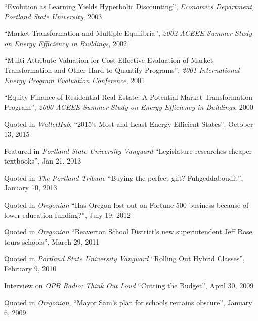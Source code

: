 \documentclass[Computer Science]{vita}
\begin{document}
\begin{vita}
\begin{Presentations and Invited Talks}
  \item ``Evolution as Learning Yields Hyperbolic Discounting'',
    \emph{Economics Department, Portland State University}, 2003

  \item ``Market Transformation and Multiple Equilibria'', \emph{2002
      ACEEE Summer Study on Energy Efficiency in Buildings}, 2002
	
  \item ``Multi-Attribute Valuation for Cost Effective Evaluation of
    Market Transformation and Other Hard to Quantify Programs'',
    \emph{2001 International Energy Program Evaluation Conference},
    2001
	
  \item ``Equity Finance of Residential Real Estate: A Potential
    Market Transformation Program'', \emph{2000 ACEEE Summer Study on
      Energy Efficiency in Buildings}, 2000

  \end{Presentations and Invited Talks}

\begin{Media Outreach}
  \item Quoted in \emph{WalletHub}, ``2015’s Most and Least Energy Efficient States'', October 13, 2015
  

  \item Featured in \emph{Portland State University Vanguard} ``Legislature researches cheaper textbooks'', Jan 21, 2013
  
  \item Quoted in \emph{The Portland Tribune} ``Buying the perfect gift? Fuhgeddaboudit'', January 10, 2013
  
\item Quoted in \emph{Oregonian} ``Has Oregon lost out on Fortune 500 business because of lower education funding?'', July 19, 2012

\item Quoted in \emph{Oregonian} ``Beaverton School District's new superintendent Jeff Rose tours schools'', March 29, 2011
  
  \item Quoted in \emph{Portland State University Vanguard} ``Rolling Out Hybrid Classes'', February 9, 2010
  
  \item Interview on \emph{OPB Radio: Think Out Loud} ``Cutting the
    Budget'', April 30, 2009

  \item Quoted in \emph{Oregonian}, ``Mayor Sam's plan for schools
    remains obscure'', January 6, 2009


\end{Media Outreach}
\end{vita}
\end{document}
